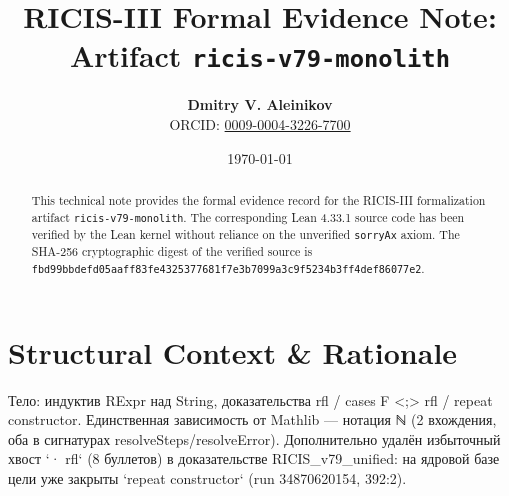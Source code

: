 \documentclass[11pt,a4paper]{article}
\title{\textbf{RICIS-III Formal Evidence Note:\\Artifact \texttt{ricis-v79-monolith}}}
\author{\textbf{Dmitry V. Aleinikov}\\ORCID: \href{https://orcid.org/0009-0004-3226-7700}{0009-0004-3226-7700}}
\date{\today}
\begin{document}
\maketitle

\begin{abstract}
This technical note provides the formal evidence record for the RICIS-III formalization artifact \texttt{ricis-v79-monolith}.
The corresponding Lean 4.33.1 source code has been verified by the Lean kernel without reliance on the unverified \texttt{sorryAx} axiom.
The SHA-256 cryptographic digest of the verified source is \texttt{fbd99bbdefd05aaff83fe4325377681f7e3b7099a3c9f5234b3ff4def86077e2}.
\end{abstract}

\section{Structural Context & Rationale}
Тело: индуктив RExpr над String, доказательства rfl / cases F <;> rfl / repeat constructor. Единственная зависимость от Mathlib — нотация ℕ (2 вхождения, оба в сигнатурах resolveSteps/resolveError). Дополнительно удалён избыточный хвост `· rfl` (8 буллетов) в доказательстве RICIS_v79_unified: на ядровой базе цели уже закрыты `repeat constructor` (run 34870620154, 392:2).
\end{document}
